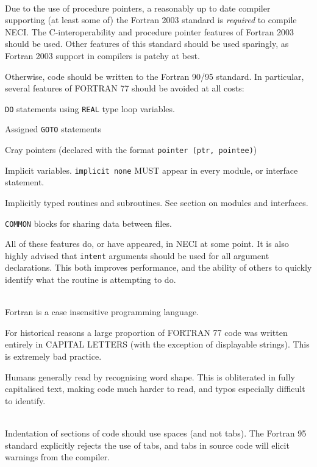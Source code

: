 \documentclass[a4paper,notitlepage]{scrreprt}
\newenvironment{packed_itemize}{
	\begin{itemize}
		\setlength{\itemsep}{1pt}
		\setlength{\parskip}{0pt}
		\setlength{\parsep}{0pt}
	}{\end{itemize}}
\newcommand\headitem[1]{\needspace{1.5\baselineskip}\item[{\boldmath #1 \nopagebreak}] \hfill \\ \nopagebreak}
\let\code\lstinline
\begin{document}
\begin{description}

	\headitem{Fortran standard}
		Due to the use of procedure pointers, a reasonably up to date compiler
		supporting (at least some of) the Fortran 2003 standard is
		\emph{required} to compile NECI. The C-interoperability and procedure
		pointer features of Fortran 2003 should be used. Other features of this
		standard should be used sparingly, as Fortran 2003 support in compilers
		is patchy at best.

		Otherwise, code should be written to the Fortran 90/95 standard. In
		particular, several features of FORTRAN 77 should be avoided at all
		costs:
		\begin{packed_itemize}
			\item
				\code{DO} statements using \code{REAL} type loop
				variables.
			\item Assigned \code{GOTO} statements
			\item
				Cray pointers (declared with the format
				\code{pointer (ptr, pointee)})
			\item
				Implicit variables. \code{implicit none} MUST appear in
				every module, or interface statement.
			\item
				Implicitly typed routines and subroutines. See section on
				modules and interfaces.
			\item
				\code{COMMON} blocks for sharing data between files.
		\end{packed_itemize}
		All of these features do, or have appeared, in NECI at some point. It is also highly advised that \code{intent} arguments should be used for all argument declarations. This both improves performance, and the ability of others to quickly identify what the routine is attempting to do.

	\headitem{CAPITAL letters}
		Fortran is a case insensitive programming language.

		For historical reasons a large proportion of FORTRAN 77 code was
		written entirely in CAPITAL LETTERS (with the exception of displayable
		strings). This is extremely bad practice.

		Humans generally read by recognising word shape. This is obliterated
		in fully capitalised text, making code much harder to read, and typos
		especially difficult to identify.

	\headitem{Indentation}
		Indentation of sections of code should use spaces (and not tabs). The
		Fortran 95 standard explicitly rejects the use of tabs, and tabs in
		source code will elicit warnings from the compiler.


\end{description}
\end{document}
